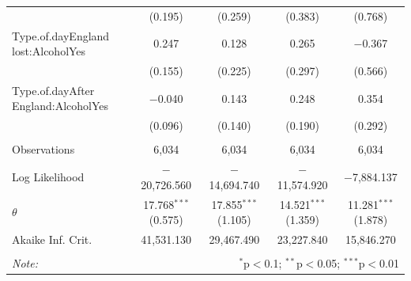 \documentclass[12pt, letterpaper]{article}
\begin{document}
\begin{table}
{\begin{tabular}{@{\extracolsep{5pt}}lcccc}
  & (0.195) & (0.259) & (0.383) & (0.768) \\ 
  Type.of.dayEngland lost:AlcoholYes & 0.247 & 0.128 & 0.265 & $-$0.367 \\ 
  & (0.155) & (0.225) & (0.297) & (0.566) \\ 
  Type.of.dayAfter England:AlcoholYes & $-$0.040 & 0.143 & 0.248 & 0.354 \\ 
  & (0.096) & (0.140) & (0.190) & (0.292) \\ 
 \hline \\[-1.8ex] 
Observations & 6,034 & 6,034 & 6,034 & 6,034 \\ 
Log Likelihood & $-$20,726.560 & $-$14,694.740 & $-$11,574.920 & $-$7,884.137 \\ 
$\theta$ & 17.768$^{***}$  (0.575) & 17.855$^{***}$  (1.105) & 14.521$^{***}$  (1.359) & 11.281$^{***}$  (1.878) \\ 
Akaike Inf. Crit. & 41,531.130 & 29,467.490 & 23,227.840 & 15,846.270 \\ 
\hline 
\hline \\[-1.8ex] 
\textit{Note:}  & \multicolumn{4}{r}{$^{*}$p$<$0.1; $^{**}$p$<$0.05; $^{***}$p$<$0.01} \\ 
\end{tabular} 
 
  }
\end{table}

\clearpage
\printbibliography
\end{document}

